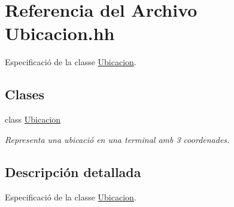 \hypertarget{_ubicacion_8hh}{}\section{Referencia del Archivo Ubicacion.\+hh}
\label{_ubicacion_8hh}


Especificació de la classe \hyperlink{class_ubicacion}{Ubicacion}.  


\subsection*{Clases}
\begin{DoxyCompactItemize}
\item 
class \hyperlink{class_ubicacion}{Ubicacion}
\begin{DoxyCompactList}\small\item\em Representa una ubicació en una terminal amb 3 coordenades. \end{DoxyCompactList}\end{DoxyCompactItemize}


\subsection{Descripción detallada}
Especificació de la classe \hyperlink{class_ubicacion}{Ubicacion}. 

